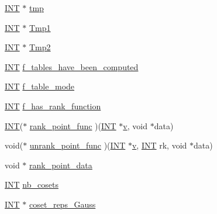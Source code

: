 \begin{DoxyCompactItemize}
\item 
\mbox{\hyperlink{galois_8h_a09fddde158a3a20bd2dcadb609de11dc}{I\+NT}} $\ast$ \mbox{\hyperlink{classaction__on__factor__space_a45d161ab7d8c37d0123783901f1054dc}{tmp}}
\item 
\mbox{\hyperlink{galois_8h_a09fddde158a3a20bd2dcadb609de11dc}{I\+NT}} $\ast$ \mbox{\hyperlink{classaction__on__factor__space_aa4cd7e8600a9f997ffa12037dcf42634}{Tmp1}}
\item 
\mbox{\hyperlink{galois_8h_a09fddde158a3a20bd2dcadb609de11dc}{I\+NT}} $\ast$ \mbox{\hyperlink{classaction__on__factor__space_a6c49fa7ef4805f772db1ad9b52ec6ed4}{Tmp2}}
\item 
\mbox{\hyperlink{galois_8h_a09fddde158a3a20bd2dcadb609de11dc}{I\+NT}} \mbox{\hyperlink{classaction__on__factor__space_ab995721ba9014ed4b8dd00bad16fa968}{f\+\_\+tables\+\_\+have\+\_\+been\+\_\+computed}}
\item 
\mbox{\hyperlink{galois_8h_a09fddde158a3a20bd2dcadb609de11dc}{I\+NT}} \mbox{\hyperlink{classaction__on__factor__space_a2c74065cab065a3f87b626f72f8b9c0d}{f\+\_\+table\+\_\+mode}}
\item 
\mbox{\hyperlink{galois_8h_a09fddde158a3a20bd2dcadb609de11dc}{I\+NT}} \mbox{\hyperlink{classaction__on__factor__space_a00d7552a5d2afe5efeb8e6110ee0397b}{f\+\_\+has\+\_\+rank\+\_\+function}}
\item 
\mbox{\hyperlink{galois_8h_a09fddde158a3a20bd2dcadb609de11dc}{I\+NT}}($\ast$ \mbox{\hyperlink{classaction__on__factor__space_a75d2935031a5f79d8a8a91ef7057d0ed}{rank\+\_\+point\+\_\+func}} )(\mbox{\hyperlink{galois_8h_a09fddde158a3a20bd2dcadb609de11dc}{I\+NT}} $\ast$\mbox{\hyperlink{simeon_8_c_aeb3f3030944801b163bc3b829a7f6710}{v}}, void $\ast$data)
\item 
void($\ast$ \mbox{\hyperlink{classaction__on__factor__space_ae22a1e77aff9c3afbb2f0f49e48cd89b}{unrank\+\_\+point\+\_\+func}} )(\mbox{\hyperlink{galois_8h_a09fddde158a3a20bd2dcadb609de11dc}{I\+NT}} $\ast$\mbox{\hyperlink{simeon_8_c_aeb3f3030944801b163bc3b829a7f6710}{v}}, \mbox{\hyperlink{galois_8h_a09fddde158a3a20bd2dcadb609de11dc}{I\+NT}} rk, void $\ast$data)
\item 
void $\ast$ \mbox{\hyperlink{classaction__on__factor__space_ab7d680341019cc4abecd82962e05b105}{rank\+\_\+point\+\_\+data}}
\item 
\mbox{\hyperlink{galois_8h_a09fddde158a3a20bd2dcadb609de11dc}{I\+NT}} \mbox{\hyperlink{classaction__on__factor__space_a230f871d91995915cfa94c5b1b83bed2}{nb\+\_\+cosets}}
\item 
\mbox{\hyperlink{galois_8h_a09fddde158a3a20bd2dcadb609de11dc}{I\+NT}} $\ast$ \mbox{\hyperlink{classaction__on__factor__space_ade860a3254ebee32de921910728bfac5}{coset\+\_\+reps\+\_\+\+Gauss}}

\end{DoxyCompactItemize}
